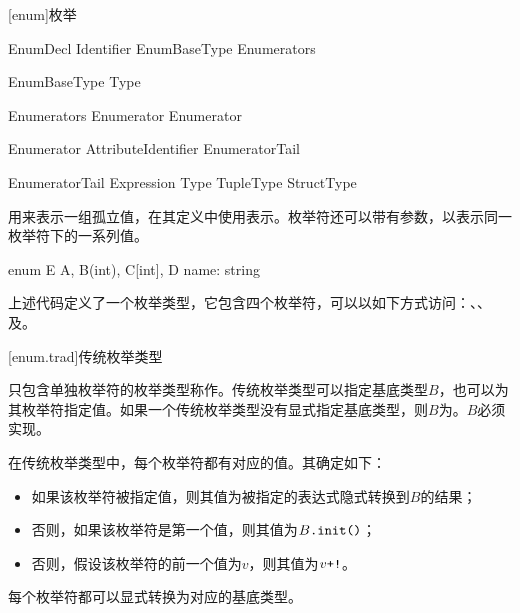 
[enum]{枚举}

\begin{bnf}{EnumDecl}
     Identifier EnumBaseType\bnfq \terminal{\{} Enumerators \terminal{\}}
\end{bnf}

\begin{bnf}{EnumBaseType}
    \terminal{:} Type
\end{bnf}

\begin{bnf}{Enumerators}
    Enumerator \bnflp \terminal{,} Enumerator \bnfrp\bnfs \terminal{,}\bnfq
\end{bnf}

\begin{bnf}{Enumerator}
    Attribute\bnfq Identifier EnumeratorTail\bnfq
\end{bnf}

\begin{bnf}{EnumeratorTail}
    \terminal{=} Expression \br
    \terminal{[} Type \terminal{]} \br
    TupleType \br
    StructType
\end{bnf}

\pnum
{}用来表示一组孤立值，在其定义中使用表示。枚举符还可以带有参数，以表示同一枚举符下的一系列值。

\enterexample
\begin{codeblock}

enum E {
    A,
    B(int),
    C[int],
    D{ name: string }
}

\end{codeblock}

上述代码定义了一个枚举类型，它包含四个枚举符，可以以如下方式访问：、、及。
\exitexample

[enum.trad]{传统枚举类型}

\pnum
只包含单独枚举符的枚举类型称作。传统枚举类型可以指定基底类型$B$，也可以为其枚举符指定值。如果一个传统枚举类型没有显式指定基底类型，则$B$为。$B$必须实现。

\pnum
在传统枚举类型中，每个枚举符都有对应的值。其确定如下：

\begin{itemize}
    \item 如果该枚举符被指定值，则其值为被指定的表达式隐式转换到$B$的结果；
    \item 否则，如果该枚举符是第一个值，则其值为$B\texttt{.init()}$；
    \item 否则，假设该枚举符的前一个值为$v$，则其值为$v\texttt{+!}$。
\end{itemize}

每个枚举符都可以显式转换为对应的基底类型。